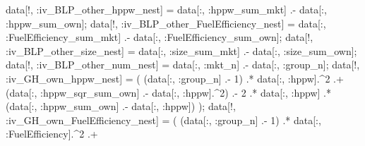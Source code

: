 \documentclass[
  letterpaper,
  DIV=11,
  numbers=noendperiod]{scrreprt}
\newenvironment{Shaded}{\begin{snugshade}}{\end{snugshade}}
\newcommand{\FloatTok}[1]{\textcolor[rgb]{0.68,0.00,0.00}{#1}}
\newcommand{\NormalTok}[1]{\textcolor[rgb]{0.00,0.23,0.31}{#1}}
\newcommand{\OperatorTok}[1]{\textcolor[rgb]{0.37,0.37,0.37}{#1}}
\begin{document}
\begin{Shaded}
\begin{Highlighting}[]
\NormalTok{data[!, }\OperatorTok{:}\NormalTok{iv\_BLP\_other\_hppw\_nest]           }\OperatorTok{=}\NormalTok{ data[}\OperatorTok{:}\NormalTok{, }\OperatorTok{:}\NormalTok{hppw\_sum\_mkt]           }\OperatorTok{.{-}}\NormalTok{ data[}\OperatorTok{:}\NormalTok{, }\OperatorTok{:}\NormalTok{hppw\_sum\_own];}
\NormalTok{data[!, }\OperatorTok{:}\NormalTok{iv\_BLP\_other\_FuelEfficiency\_nest] }\OperatorTok{=}\NormalTok{ data[}\OperatorTok{:}\NormalTok{, }\OperatorTok{:}\NormalTok{FuelEfficiency\_sum\_mkt] }\OperatorTok{.{-}}\NormalTok{ data[}\OperatorTok{:}\NormalTok{, }\OperatorTok{:}\NormalTok{FuelEfficiency\_sum\_own];}
\NormalTok{data[!, }\OperatorTok{:}\NormalTok{iv\_BLP\_other\_size\_nest]           }\OperatorTok{=}\NormalTok{ data[}\OperatorTok{:}\NormalTok{, }\OperatorTok{:}\NormalTok{size\_sum\_mkt]           }\OperatorTok{.{-}}\NormalTok{ data[}\OperatorTok{:}\NormalTok{, }\OperatorTok{:}\NormalTok{size\_sum\_own];}
\NormalTok{data[!, }\OperatorTok{:}\NormalTok{iv\_BLP\_other\_num\_nest]            }\OperatorTok{=}\NormalTok{ data[}\OperatorTok{:}\NormalTok{, }\OperatorTok{:}\NormalTok{mkt\_n]                  }\OperatorTok{.{-}}\NormalTok{ data[}\OperatorTok{:}\NormalTok{, }\OperatorTok{:}\NormalTok{group\_n];}
\NormalTok{data[!, }\OperatorTok{:}\NormalTok{iv\_GH\_own\_hppw\_nest]             }\OperatorTok{=}\NormalTok{ (}
\NormalTok{    (data[}\OperatorTok{:}\NormalTok{, }\OperatorTok{:}\NormalTok{group\_n] }\OperatorTok{.{-}} \FloatTok{1}\NormalTok{) }\OperatorTok{.*}\NormalTok{ data[}\OperatorTok{:}\NormalTok{, }\OperatorTok{:}\NormalTok{hppw]}\OperatorTok{.\^{}}\FloatTok{2} \OperatorTok{.+} 
\NormalTok{    (data[}\OperatorTok{:}\NormalTok{, }\OperatorTok{:}\NormalTok{hppw\_sqr\_sum\_own] }\OperatorTok{.{-}}\NormalTok{ data[}\OperatorTok{:}\NormalTok{, }\OperatorTok{:}\NormalTok{hppw]}\OperatorTok{.\^{}}\FloatTok{2}\NormalTok{) }\OperatorTok{.{-}} 
    \FloatTok{2} \OperatorTok{.*}\NormalTok{ data[}\OperatorTok{:}\NormalTok{, }\OperatorTok{:}\NormalTok{hppw] }\OperatorTok{.*}\NormalTok{ (data[}\OperatorTok{:}\NormalTok{, }\OperatorTok{:}\NormalTok{hppw\_sum\_own] }\OperatorTok{.{-}}\NormalTok{ data[}\OperatorTok{:}\NormalTok{, }\OperatorTok{:}\NormalTok{hppw])}
\NormalTok{);}
\NormalTok{data[!, }\OperatorTok{:}\NormalTok{iv\_GH\_own\_FuelEfficiency\_nest]   }\OperatorTok{=}\NormalTok{ (}
\NormalTok{    (data[}\OperatorTok{:}\NormalTok{, }\OperatorTok{:}\NormalTok{group\_n] }\OperatorTok{.{-}} \FloatTok{1}\NormalTok{) }\OperatorTok{.*}\NormalTok{ data[}\OperatorTok{:}\NormalTok{, }\OperatorTok{:}\NormalTok{FuelEfficiency]}\OperatorTok{.\^{}}\FloatTok{2} \OperatorTok{.+} 

\end{Highlighting}
\end{Shaded}
\end{document}
